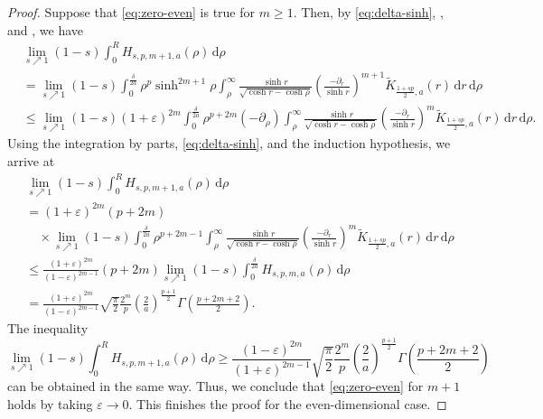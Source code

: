 \documentclass[10pt,a4paper]{amsart}
\begin{document}
\begin{proof}
Suppose that \eqref{eq:zero-even} is true for $m \geq 1$. Then, by \eqref{eq:delta-sinh}, , and , we have
\begin{equation*}
\begin{split}
&\lim_{s \nearrow 1} (1-s) \int_{0}^{R} H_{s, p, m+1, a}(\rho) \, \mathrm{d}\rho \\
&= \lim_{s \nearrow 1} (1-s) \int_{0}^{\frac{\delta}{2a}} \rho^{p} \sinh^{2m+1}\rho \int_{\rho}^{\infty} \frac{\sinh r}{\sqrt{\cosh r - \cosh \rho}} \left( \frac{-\partial_{r}}{\sinh r} \right)^{m+1} \widetilde{K}_{\frac{1+sp}{2},a}(r) \, \mathrm{d}r \, \mathrm{d}\rho \\
&\leq \lim_{s \nearrow 1} (1-s) (1+\varepsilon)^{2m} \int_{0}^{\frac{\delta}{2a}} \rho^{p+2m} (-\partial_{\rho}) \int_{\rho}^{\infty} \frac{\sinh r}{\sqrt{\cosh r - \cosh \rho}} \left( \frac{-\partial_{r}}{\sinh r} \right)^{m} \widetilde{K}_{\frac{1+sp}{2},a}(r) \, \mathrm{d}r \, \mathrm{d}\rho.
\end{split}
\end{equation*}
Using the integration by parts, \eqref{eq:delta-sinh}, and the induction hypothesis, we arrive at
\begin{equation*}
\begin{split}
&\lim_{s \nearrow 1} (1-s) \int_{0}^{R} H_{s, p, m+1, a}(\rho) \, \mathrm{d}\rho \\
&= (1+\varepsilon)^{2m} (p+2m) \\
&\quad\times \lim_{s \nearrow 1} (1-s) \int_{0}^{\frac{\delta}{2a}} \rho^{p+2m-1} \int_{\rho}^{\infty} \frac{\sinh r}{\sqrt{\cosh r - \cosh \rho}} \left( \frac{-\partial_{r}}{\sinh r} \right)^{m} \widetilde{K}_{\frac{1+sp}{2},a}(r) \, \mathrm{d}r \, \mathrm{d}\rho \\
&\leq \frac{(1+\varepsilon)^{2m}}{(1-\varepsilon)^{2m-1}} (p+2m) \lim_{s \nearrow 1} (1-s) \int_{0}^{\frac{\delta}{2a}} H_{s, p, m, a}(\rho) \, \mathrm{d}\rho \\
&= \frac{(1+\varepsilon)^{2m}}{(1-\varepsilon)^{2m-1}} \sqrt{\frac{\pi}{2}} \frac{2^{m}}{p} \left( \frac{2}{a} \right)^{\frac{p+1}{2}} \Gamma\left(\frac{p+2m+2}{2} \right).
\end{split}
\end{equation*}
The inequality
\begin{equation*}
\lim_{s \nearrow 1} (1-s) \int_{0}^{R} H_{s, p, m+1, a}(\rho) \, \mathrm{d}\rho \geq \frac{(1-\varepsilon)^{2m}}{(1+\varepsilon)^{2m-1}} \sqrt{\frac{\pi}{2}} \frac{2^{m}}{p} \left( \frac{2}{a} \right)^{\frac{p+1}{2}} \Gamma\left( \frac{p+2m+2}{2} \right)
\end{equation*}
can be obtained in the same way. Thus, we conclude that \eqref{eq:zero-even} for $m+1$ holds by taking $\varepsilon \to 0$. This finishes the proof for the even-dimensional case.
\end{proof}
\end{document}
